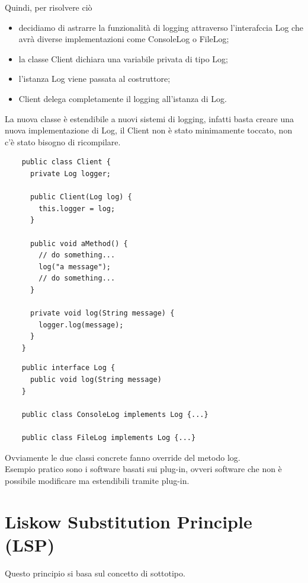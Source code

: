 \newpage
Quindi, per risolvere ciò
\begin{itemize}
  \item decidiamo di astrarre la funzionalità di logging attraverso l'interafccia Log che avrà diverse implementazioni come ConsoleLog o FileLog;
  \item la classe Client dichiara una variabile privata di tipo Log;
  \item l’istanza Log viene passata al costruttore;
  \item Client delega completamente il logging all’istanza di Log.
\end{itemize}

La nuova classe è estendibile a nuovi sistemi di logging, infatti basta creare una nuova implementazione di Log, il Client non è stato minimamente toccato, non c'è stato bisogno di ricompilare.

\begin{multicols}{2}
  \begin{lstlisting}
    public class Client {
      private Log logger;
        
      public Client(Log log) {
        this.logger = log;
      }
        
      public void aMethod() {
        // do something...
        log("a message");
        // do something...
      }
    
      private void log(String message) {
        logger.log(message);
      }
    }
  \end{lstlisting}
  \columnbreak
  \begin{lstlisting}
    public interface Log {
      public void log(String message)
    }

    public class ConsoleLog implements Log {...}

    public class FileLog implements Log {...}
  \end{lstlisting}  
\end{multicols}
Ovviamente le due classi concrete fanno override del metodo log.\\
Esempio pratico sono i software basati sui plug-in, ovveri software che non è possibile modificare ma estendibili tramite plug-in.\\

\section{Liskow Substitution Principle (LSP)}
 
Questo principio si basa sul concetto di sottotipo.

